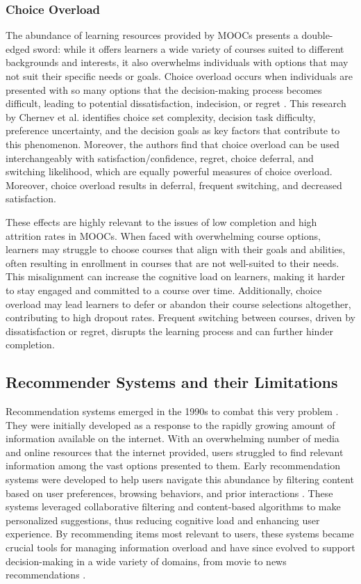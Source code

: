 \subsubsection{Choice Overload}

The abundance of learning resources provided by MOOCs presents a double-edged sword: while it offers learners a wide variety of courses suited to different backgrounds and interests, it also overwhelms individuals with options that may not suit their specific needs or goals. Choice overload occurs when individuals are presented with so many options that the decision-making process becomes difficult, leading to potential dissatisfaction, indecision, or regret  \cite{chernev_choice_2015}. This research by Chernev et al. identifies choice set complexity, decision task difficulty, preference uncertainty, and the decision goals as key factors that contribute to this phenomenon. Moreover, the authors find that choice overload can be used interchangeably with satisfaction/confidence, regret, choice deferral, and switching likelihood, which are equally powerful measures of choice overload. Moreover, choice overload results in deferral, frequent switching, and decreased satisfaction. 

These effects are highly relevant to the issues of low completion and high attrition rates in MOOCs. When faced with overwhelming course options, learners may struggle to choose courses that align with their goals and abilities, often resulting in enrollment in courses that are not well-suited to their needs. This misalignment can increase the cognitive load on learners, making it harder to stay engaged and committed to a course over time. Additionally, choice overload may lead learners to defer or abandon their course selections altogether, contributing to high dropout rates. Frequent switching between courses, driven by dissatisfaction or regret, disrupts the learning process and can further hinder completion.

\subsection{Recommender Systems and their Limitations} 

Recommendation systems emerged in the 1990s to combat this very problem \cite{goldberg_using_1992}. They were initially developed as a response to the rapidly growing amount of information available on the internet. With an overwhelming number of media and online resources that the internet provided, users struggled to find relevant information among the vast options presented to them. Early recommendation systems were developed to help users navigate this abundance by filtering content based on user preferences, browsing behaviors, and prior interactions \cite{lutz_mafiaactive_1990}. These systems leveraged collaborative filtering and content-based algorithms to make personalized suggestions, thus reducing cognitive load and enhancing user experience. By recommending items most relevant to users, these systems became crucial tools for managing information overload and have since evolved to support decision-making in a wide variety of domains, from movie \cite{dong_brief_2022} to news recommendations \cite{resnick_grouplens_1994}.

